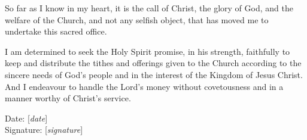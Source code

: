 \par So far as I know in my heart, it is the call of Christ, the glory of God, and the welfare of the Church, and not any selfish object, that has moved me to undertake this sacred office.

\par I am determined to seek the Holy Spirit promise, in his strength, faithfully to keep and distribute the tithes and offerings given to the Church according to the sincere needs of God's people and in the interest of the Kingdom of Jesus Christ. And I endeavour to handle the Lord's money without covetousness and in a manner worthy of Christ's service.

\par Date: [\textit{date}]
\\Signature: [\textit{signature}]
